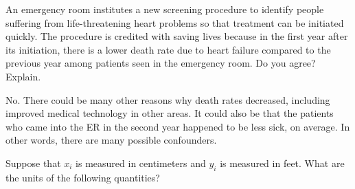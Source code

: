 \documentclass[addpoints,12pt]{exam}
\begin{document}
\begin{questions}



\question An emergency room institutes a new screening procedure to identify people suffering from life-threatening heart problems so that treatment can be initiated quickly. The procedure is credited with saving lives because in the first year after its initiation, there is a lower death rate due to heart failure compared to the previous year among patients seen in the emergency room. Do you agree? Explain.
\begin{solution}
	No. There could be many other reasons why death rates decreased, including improved medical technology in other areas. It could also be that the patients who came into the ER in the second year happened to be less sick, on average. In other words, there are many possible confounders.
\end{solution}



\question Suppose that $x_i$ is measured in centimeters and $y_i$ is measured in feet. What are the units of the following quantities? 
	\begin{parts}

\end{parts}
\end{questions}
\end{document}
